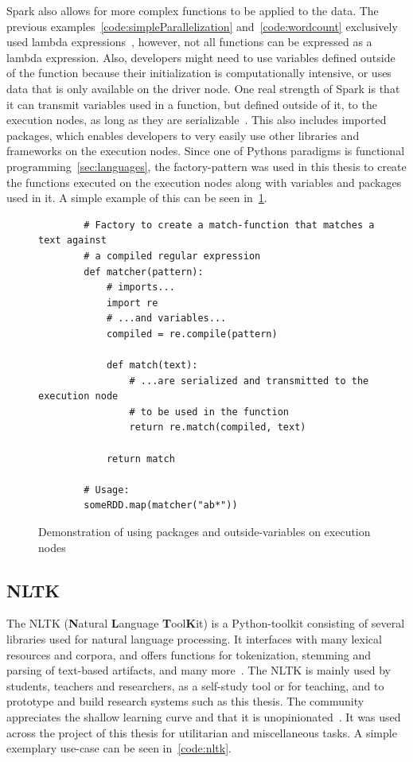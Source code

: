 Spark also allows for more complex functions to be applied to the data.
The previous examples~\ref{code:simpleParallelization} and~\ref{code:wordcount} exclusively used lambda expressions~\cite{pythonDocs},
however, not all functions can be expressed as a lambda expression.
Also, developers might need to use variables defined outside of the function because their initialization is computationally intensive,
or uses data that is only available on the driver node.
One real strength of Spark is that it can transmit variables used in a function, but defined outside of it, to the execution nodes, as long as they are serializable~\cite{sparkDocs}.
This also includes imported packages, which enables developers to very easily use other libraries and frameworks on the execution nodes.
Since one of Pythons paradigms is functional programming~\ref{sec:languages},
the factory-pattern was used in this thesis to create the functions executed on the execution nodes along with variables and packages used in it.
A simple example of this can be seen in~\ref{code:factory}.

\begin{figure}
    \caption{Demonstration of using packages and outside-variables on execution nodes}
    \label{code:factory}
    \begin{verbatim}
        # Factory to create a match-function that matches a text against
        # a compiled regular expression
        def matcher(pattern):
            # imports...
            import re
            # ...and variables...
            compiled = re.compile(pattern)

            def match(text):
                # ...are serialized and transmitted to the execution node
                # to be used in the function
                return re.match(compiled, text)

            return match

        # Usage:
        someRDD.map(matcher("ab*"))
    \end{verbatim}
\end{figure}

\subsection{NLTK}
\label{subsec:nltk}

The NLTK (\textbf{N}atural \textbf{L}anguage \textbf{T}ool\textbf{K}it) is a Python-toolkit consisting of several libraries used for
natural language processing.
It interfaces with many lexical resources and corpora, and offers functions for tokenization, stemming and parsing of text-based artifacts,
and many more~\cite{nltkDocs}.
The NLTK is mainly used by students, teachers and researchers, as a self-study tool or for teaching,
and to prototype and build research systems such as this thesis.
The community appreciates the shallow learning curve and that it is unopinionated~\cite{Bird2006}.
It was used across the project of this thesis for utilitarian and miscellaneous tasks.
A simple exemplary use-case can be seen in~\ref{code:nltk}.

